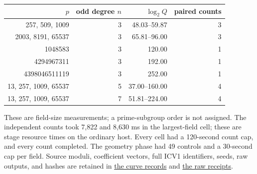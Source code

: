 \documentclass[11pt]{article}
\begin{document}
\begin{center}
\begin{tabular}{rrrr}
\toprule
$p$ & odd degree $n$ & $\log_2 Q$ & paired counts \\
\midrule
257, 509, 1009 & 3 & 48.03--59.87 & 3\\
2003, 8191, 65537 & 3 & 65.81--96.00 & 3\\
1048583 & 3 & 120.00 & 1\\
4294967311 & 3 & 192.00 & 1\\
4398046511119 & 3 & 252.00 & 1\\
13, 257, 1009, 65537 & 5 & 37.00--160.00 & 4\\
13, 257, 1009, 65537 & 7 & 51.81--224.00 & 4\\
\bottomrule
\end{tabular}
\end{center}
These are field-size measurements; a prime-subgroup order is not assigned.
The independent counts took 7,822 and 8,630 ms in the largest-field cell;
these are stage resource times on the ordinary host. Every cell had a
120-second count cap, and every count completed. The geometry phase had
49 controls and a 30-second cap per field. Source moduli, coefficient
vectors, full ICV1 identifiers, seeds, raw outputs, and hashes are retained
in \href{curve_records.json}{the curve records} and
\href{evidence_run1/receipts.tsv}{the raw receipts}.
\end{document}
